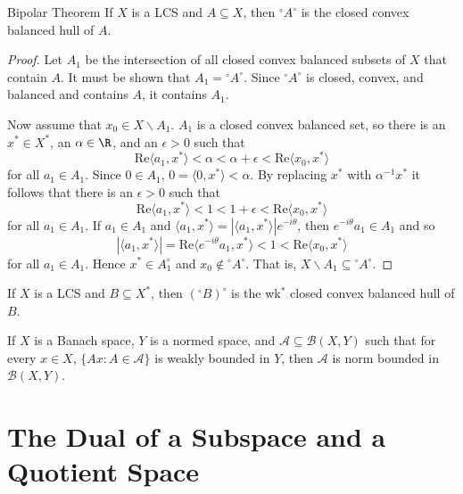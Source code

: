 \begin{nthm}{Bipolar Theorem}
    If $X$ is a LCS and $A \subseteq X$, then ${}^{\circ}A^{\circ}$ is the closed convex balanced hull of $A$.
\end{nthm}
\begin{proof}
    Let $A_1$ be the intersection of all closed convex balanced subsets of $X$ that contain $A$. It must be shown that $A_1 = {}^{\circ}A^{\circ}$. Since ${}^{\circ}A^{\circ}$ is closed, convex, and balanced and contains $A$, it contains $A_1$.

    Now assume that $x_0 \in X\backslash A_1$. $A_1$ is a closed convex balanced set, so there is an $x^* \in X^*$, an $\alpha \in \R$, and an $\epsilon > 0$ such that $$\text{Re}\langle a_1,x^*\rangle < \alpha < \alpha+\epsilon < \text{Re}\langle x_0,x^*\rangle$$
    for all $a_1 \in A_1$. Since $0 \in A_1$, $0 = \langle 0,x^*\rangle < \alpha$. By replacing $x^*$ with $\alpha^{-1}x^*$ it follows that there is an $\epsilon > 0$ such that $$\text{Re}\langle a_1,x^*\rangle < 1 < 1+\epsilon < \text{Re}\langle x_0,x^*\rangle$$
    for all $a_1 \in A_1$. If $a_1 \in A_1$ and $\langle a_1,x^*\rangle = |\langle a_1,x^*\rangle| e^{-i\theta}$, then $e^{-i\theta}a_1 \in A_1$ and so $$|\langle a_1,x^*\rangle| = \text{Re}\langle e^{-i\theta}a_1,x^*\rangle < 1 < \text{Re}\langle x_0,x^*\rangle$$
    for all $a_1 \in A_1$. Hence $x^* \in A_1^{\circ}$ and $x_0 \notin {}^{\circ}A^{\circ}$. That is, $X\backslash A_1\subseteq {}^{\circ}A^{\circ}$.
\end{proof}

\begin{cor}
    If $X$ is a LCS and $B \subseteq X^*$, then $({}^{\circ}B)^{\circ}$ is the wk$^*$ closed convex balanced hull of $B$.
\end{cor}


\begin{thm}
    If $X$ is a Banach space, $Y$ is a normed space, and $\mathscr{A} \subseteq \mathscr{B}(X,Y)$ such that for every $x \in X$, $\{Ax:A\in \mathscr{A}\}$ is weakly bounded in $Y$, then $\mathscr{A}$ is norm bounded in $\mathscr{B}(X,Y)$.
\end{thm}



\section{The Dual of a Subspace and a Quotient Space}
\label{sec:DualQuot}

